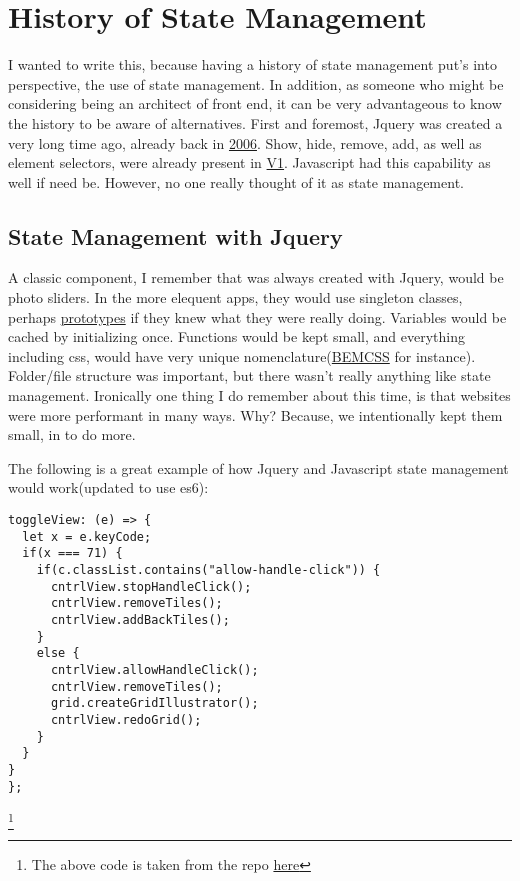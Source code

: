 \maketitle{}
\section{ History of State Management }

I wanted to write this, because having a history of state management put's into
perspective, the use of state management. In addition, as someone who might be
considering being an architect of front end, it can be very advantageous to
know the history to be aware of alternatives. First and foremost, Jquery was
created a very long time ago, already back in \href{https://en.wikipedia.org/wiki/JQuery}{2006}.
Show, hide, remove, add, as well as element selectors, were already present in
\href{http://api.jquery.com/category/version/1.0/}{V1}. Javascript had this capability
as well if need be. However, no one really thought of it as state management.

\subsection{ State Management with Jquery }
A classic component, I remember that was always created with Jquery, would be
photo sliders. In the more elequent apps, they would use singleton classes,
perhaps \href{https://www.w3schools.com/js/js\_object\_prototypes.asp}{prototypes}
if they knew what they were really doing. Variables would be cached by
initializing once. Functions would be kept small, and everything including css,
would have very unique nomenclature(\href{http://getbem.com/introduction/}{BEMCSS}
for instance). Folder/file structure was important, but there wasn't really
anything like state management. Ironically one thing I do remember about this
time, is that websites were more performant in many ways. Why? Because, we
intentionally kept them small, in to do more.

The following is a great example of how Jquery and Javascript state management
would work(updated to use es6):

\begin{lstlisting}
toggleView: (e) => {
  let x = e.keyCode;
  if(x === 71) {
    if(c.classList.contains("allow-handle-click")) {
      cntrlView.stopHandleClick();
      cntrlView.removeTiles();
      cntrlView.addBackTiles();
    }
    else {
      cntrlView.allowHandleClick();
      cntrlView.removeTiles();
      grid.createGridIllustrator();
      cntrlView.redoGrid();
    }
  }
}
};
\end{lstlisting}
\footnote{The above code is taken from the repo \href{https://github.com/CharlieGreenman/codeIllustrator/blob/master/app/js/\_control\-view.js}{here}}
